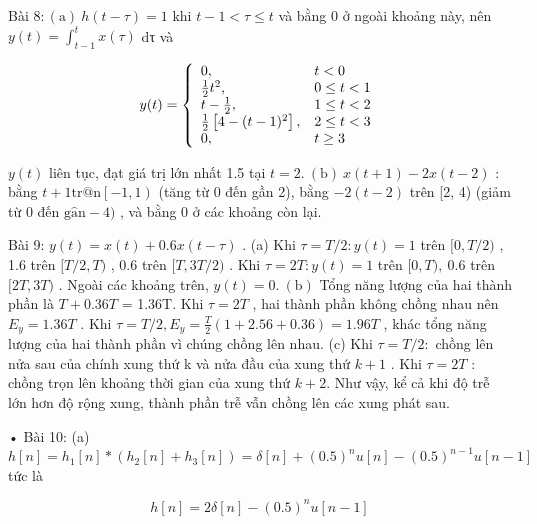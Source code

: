 \documentclass[
  10
]{article}
\begin{document}
Bài \(8 \colon ( \mathrm { a } ) \ h ( t - \tau ) = 1\) khi
\(t - 1 < \tau \leq t\) và bằng 0 ở ngoài khoảng này, nên
\(\textstyle y ( t ) = \int _ { t - 1 } ^ { t } x ( \tau )\) dτ và

\[
y (t) = \left\{ \begin{array}{l l} 0, & t <   0 \\ \frac {1}{2} t ^ {2}, & 0 \leq t <   1 \\ t - \frac {1}{2}, & 1 \leq t <   2 \\ \frac {1}{2} \left[ 4 - (t - 1) ^ {2} \right], & 2 \leq t <   3 \\ 0, & t \geq 3 \end{array} \right.
\]

\(y ( t )\) liên tục, đạt giá trị lớn nhất 1.5 tại
\(t = 2 . ~ ( \mathrm { b } ) ~ x ( t + 1 ) - 2 x ( t - 2 )\) : bằng
\(t + 1 \mathrm { t r @ n } \left[ - 1 , 1 \right)\) (tăng từ 0 đến gần
2), bằng \(- 2 ( t - 2 )\) trên {[}2, 4) (giảm từ 0 đến
\(\mathrm { g } \mathrm { \hat { a } n - 4 ) }\) , và bằng 0 ở các
khoảng còn lại.

Bài 9: \(y ( t ) = x ( t ) + 0 . 6 x ( t - \tau )\) . (a) Khi
\(\tau = T / 2 \colon y ( t ) = 1\) trên \([ 0 , T / 2 )\) , 1.6 trên
\([ T / 2 , T )\) , 0.6 trên \([ T , 3 T / 2 )\) . Khi
\(\tau = 2 T \colon y ( t ) = 1\) trên \([ 0 , T ) , \ 0 . 6\) trên
\([ 2 T , 3 T )\) . Ngoài các khoảng trên,
\(y ( t ) = 0 . \ ( \mathrm { b } )\) Tổng năng lượng của hai thành phần
là \(T + 0 . 3 6 T\) = 1.36T. Khi \(\tau = 2 T\) , hai thành phần không
chồng nhau nên \(E _ { y } = 1 . 3 6 T\) . Khi
\(\tau = T / 2 , E _ { y } = \textstyle { \frac { T } { 2 } } ( 1 + 2 . 5 6 + 0 . 3 6 ) = 1 . 9 6 T\)
, khác tổng năng lượng của hai thành phần vì chúng chồng lên nhau. (c)
Khi \(\tau = T / 2 \colon\) chồng lên nửa sau của chính xung thứ k và
nửa đầu của xung thứ \(k + 1\) . Khi \(\tau = 2 T\) : chồng trọn lên
khoảng thời gian của xung thứ \(k + 2 .\) Như vậy, kể cả khi độ trễ lớn
hơn độ rộng xung, thành phần trễ vẫn chồng lên các xung phát sau.

• Bài 10: (a)
\(h [ n ] = h _ { 1 } [ n ] * ( h _ { 2 } [ n ] + h _ { 3 } [ n ] ) = \delta [ n ] + ( 0 . 5 ) ^ { n } u [ n ] - ( 0 . 5 ) ^ { n - 1 } u [ n - 1 ]\)
tức là

\[
h [ n ] = 2 \delta [ n ] - (0. 5) ^ {n} u [ n - 1 ]
\]
\end{document}
